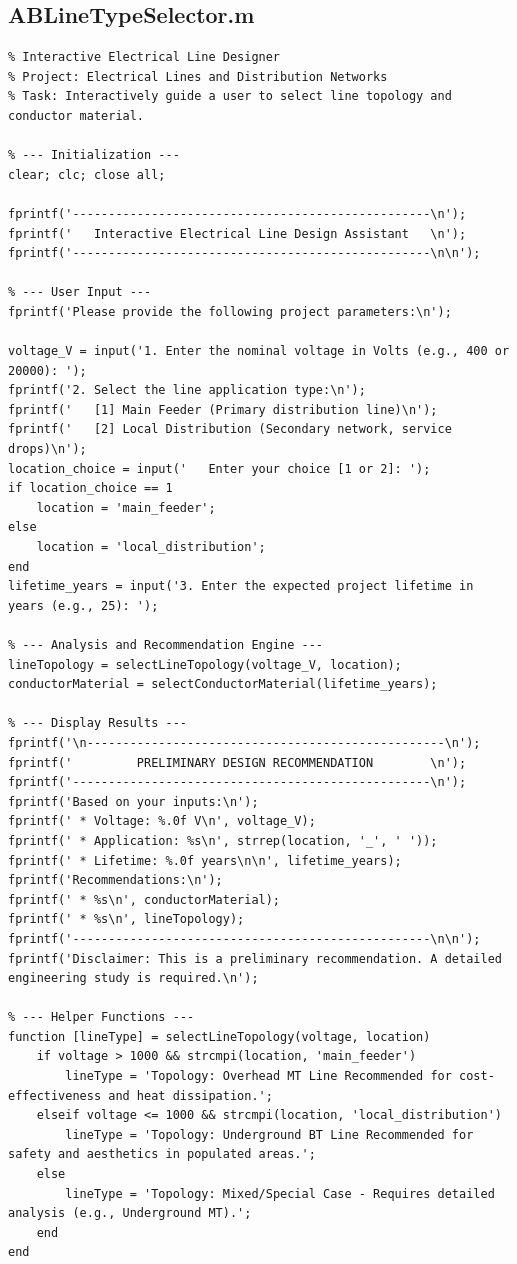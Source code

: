 \documentclass[12pt, a4paper]{article}
\begin{document}
\subsection{ABLineTypeSelector.m}
\begin{lstlisting}
% Interactive Electrical Line Designer
% Project: Electrical Lines and Distribution Networks
% Task: Interactively guide a user to select line topology and conductor material.

% --- Initialization ---
clear; clc; close all;

fprintf('--------------------------------------------------\n');
fprintf('   Interactive Electrical Line Design Assistant   \n');
fprintf('--------------------------------------------------\n\n');

% --- User Input ---
fprintf('Please provide the following project parameters:\n');

voltage_V = input('1. Enter the nominal voltage in Volts (e.g., 400 or 20000): ');
fprintf('2. Select the line application type:\n');
fprintf('   [1] Main Feeder (Primary distribution line)\n');
fprintf('   [2] Local Distribution (Secondary network, service drops)\n');
location_choice = input('   Enter your choice [1 or 2]: ');
if location_choice == 1
    location = 'main_feeder';
else
    location = 'local_distribution';
end
lifetime_years = input('3. Enter the expected project lifetime in years (e.g., 25): ');

% --- Analysis and Recommendation Engine ---
lineTopology = selectLineTopology(voltage_V, location);
conductorMaterial = selectConductorMaterial(lifetime_years);

% --- Display Results ---
fprintf('\n--------------------------------------------------\n');
fprintf('         PRELIMINARY DESIGN RECOMMENDATION        \n');
fprintf('--------------------------------------------------\n');
fprintf('Based on your inputs:\n');
fprintf(' * Voltage: %.0f V\n', voltage_V);
fprintf(' * Application: %s\n', strrep(location, '_', ' '));
fprintf(' * Lifetime: %.0f years\n\n', lifetime_years);
fprintf('Recommendations:\n');
fprintf(' * %s\n', conductorMaterial);
fprintf(' * %s\n', lineTopology);
fprintf('--------------------------------------------------\n\n');
fprintf('Disclaimer: This is a preliminary recommendation. A detailed engineering study is required.\n');

% --- Helper Functions ---
function [lineType] = selectLineTopology(voltage, location)
    if voltage > 1000 && strcmpi(location, 'main_feeder')
        lineType = 'Topology: Overhead MT Line Recommended for cost-effectiveness and heat dissipation.';
    elseif voltage <= 1000 && strcmpi(location, 'local_distribution')
        lineType = 'Topology: Underground BT Line Recommended for safety and aesthetics in populated areas.';
    else
        lineType = 'Topology: Mixed/Special Case - Requires detailed analysis (e.g., Underground MT).';
    end
end


\end{lstlisting}
\end{document}
